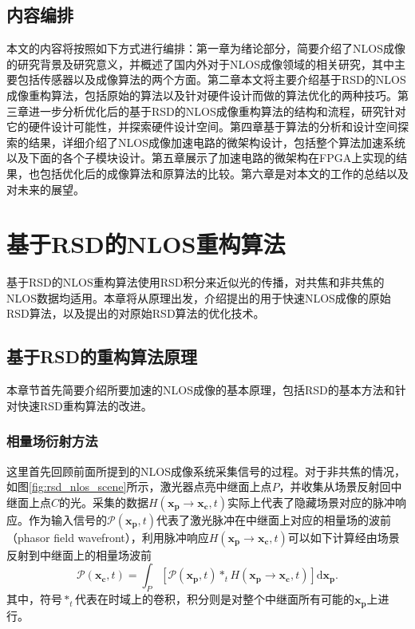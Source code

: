 \documentclass[master]{shtthesis}             %
\begin{document}
\section{内容编排}

本文的内容将按照如下方式进行编排：第一章为绪论部分，简要介绍了NLOS成像的研究背景及研究意义，并概述了国内外对于NLOS成像领域的相关研究，其中主要包括传感器以及成像算法的两个方面。第二章本文将主要介绍基于RSD的NLOS成像重构算法，包括原始的算法以及针对硬件设计而做的算法优化的两种技巧。第三章进一步分析优化后的基于RSD的NLOS成像重构算法的结构和流程，研究针对它的硬件设计可能性，并探索硬件设计空间。第四章基于算法的分析和设计空间探索的结果，详细介绍了NLOS成像加速电路的微架构设计，包括整个算法加速系统以及下面的各个子模块设计。第五章展示了加速电路的微架构在FPGA上实现的结果，也包括优化后的成像算法和原算法的比较。第六章是对本文的工作的总结以及对未来的展望。

\chapter{基于RSD的NLOS重构算法}
 
基于RSD的NLOS重构算法使用RSD积分来近似光的传播，对共焦和非共焦的NLOS数据均适用\citep{Elten2019}。本章将从原理出发，介绍\citet{Liu}提出的用于快速NLOS成像的原始RSD算法，以及\citet{jiang2021ring}提出的对原始RSD算法的优化技术。

\section{基于RSD的重构算法原理}\label{sec:rsd_recons_pp}

本章节首先简要介绍所要加速的NLOS成像的基本原理，包括RSD的基本方法和针对快速RSD重构算法的改进。

\subsection{相量场衍射方法}\label{sec:phasor_field_diff}

这里首先回顾前面所提到的NLOS成像系统采集信号的过程。对于非共焦的情况，如图\ref{fig:rsd_nlos_scene}所示，激光器点亮中继面上点$P$，并收集从场景反射回中继面上点$C$的光。采集的数据$H(\mathbf{x_p}\rightarrow \mathbf{x_c},t)$实际上代表了隐藏场景对应的脉冲响应。作为输入信号的$\mathcal{P}(\mathbf{x_p},t)$代表了激光脉冲在中继面上对应的相量场的波前（phasor field wavefront），利用脉冲响应$H(\mathbf{x_p}\rightarrow \mathbf{x_c},t)$可以如下计算经由场景反射到中继面上的相量场波前
\begin{equation}\label{eq:convt}
  \mathcal{P}(\mathbf{x_c},t) = \int_P \left[ \mathcal{P}(\mathbf{x_p},t) *_t H(\mathbf{x_p}\rightarrow \mathbf{x_c},t) \right] \text{d}\mathbf{x_p}.
\end{equation}
其中，符号$*_t$代表在时域上的卷积，积分则是对整个中继面所有可能的$\mathbf{x_p}$上进行。
\end{document}
